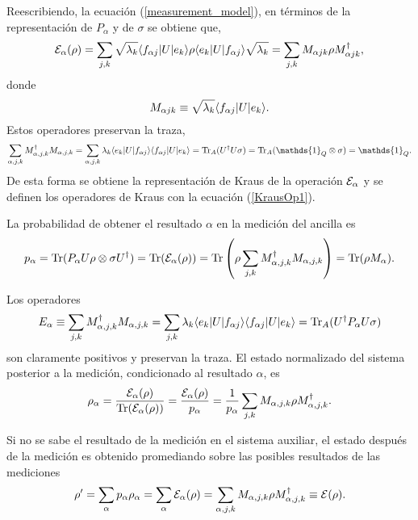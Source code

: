 Reescribiendo, la ecuación ({\ref{measurement_model}}), en términos de la
representación de $P_\alpha$ y de $\sigma$ se obtiene que,
\begin{equation}
    \mathcal{E}_\alpha(\rho)=\sum_{j,k}\sqrt{\lambda_k}\langle f_{\alpha j}|U|e_k\rangle \rho \langle e_k|U|f_{\alpha j}\rangle \sqrt{\lambda_k}=\sum_{j,k}M_{\alpha j k}\rho M_ {\alpha j k}^\dagger,
\end{equation} donde \begin{equation} \label{KrausOp1}
    M_{\alpha j k}\equiv \sqrt{\lambda_k}\langle f_{\alpha j}|U|e_k\rangle.
\end{equation}
Estos operadores preservan la traza, \[\sum_{\alpha, j,k}
M_{\alpha,j,k}^\dagger M_{\alpha,j,k}=\sum_{\alpha, j,k} \lambda_k \la
e_k|U|f_{\alpha j}\ra \la f_{\alpha j}|U|e_k\ra= \tr_A(U^\dagger U
\sigma)=\tr_A(\mathds{1}_Q\otimes\sigma)=\mathds{1}_Q.\] De esta forma se obtiene la representación de Kraus de la operación $\mathcal{E}_\alpha$ y se definen los operadores de Kraus con la ecuación ({\ref{KrausOp1}}). 

La probabilidad de obtener el resultado $\alpha$ en la medición del ancilla es {\cite{unm2014}} 
\begin{equation}
    p_\alpha={\rm Tr}(P_\alpha U\rho\otimes\sigma U^\dagger)={\rm Tr}(\mathcal{E}_\alpha(\rho))={\rm Tr}\left(\rho \sum _{j,k} M_{\alpha, j,k}^\dagger M_{\alpha,j,k}\right)={\rm Tr}(\rho M_\alpha).
\end{equation}

Los operadores \[E_\alpha \equiv \sum _{j,k} M_{\alpha, j,k}^\dagger
M_{\alpha,j,k}=\sum_{j,k} \lambda_k \langle e_k|U|f_{\alpha j}\rangle \langle f_{\alpha
j}|U|e_k\rangle={\rm Tr}_A(U^\dagger P_\alpha U\sigma) \] son claramente positivos y
preservan la traza. El estado normalizado del sistema posterior a la medición,
condicionado al resultado $\alpha$, es {\cite{unm2014}} 
\begin{equation}
    \rho_\alpha =\dfrac{\mathcal{E}_\alpha (\rho)}{{\rm Tr}(\mathcal{E}_\alpha(\rho))}=\dfrac{\mathcal{E}_\alpha(\rho)}{p_\alpha}=\dfrac{1}{p_\alpha}\sum_{j,k}M_{\alpha,j,k}\rho M_{\alpha,j,k}^\dagger.
\end{equation}

Si no se sabe el resultado de la medición en el sistema auxiliar, el estado
después de la medición es obtenido promediando sobre las posibles resultados de
las mediciones {\cite{unm2014}}
\begin{equation}
    \rho'=\sum_\alpha p_\alpha \rho_\alpha=\sum_\alpha \mathcal{E}_\alpha(\rho)=\sum_{\alpha,j,k} M_{\alpha,j,k}\rho M_{\alpha,j,k}^\dagger\equiv\mathcal{E}(\rho).
\end{equation}


